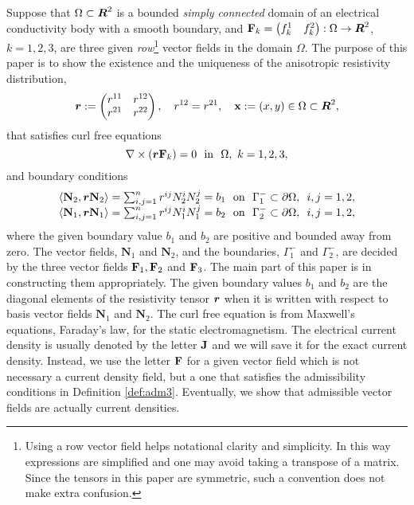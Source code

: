 \documentclass[11pt]{amsart}
\theoremstyle{plain}
\numberwithin{equation}{section}
\numberwithin{Thm}{section}
\def\R{\mbox{\boldmath$R$}}
\def\J{{\bf J}}
\def\N{{\mathbf N}}
\def\F{{\bf F}}
\def\r{{\bf r}}
\def\x{{\bf x}}
\def\r{\mbox{\boldmath$r$}}
\begin{document}
Suppose that $\Omega\subset\R^2$ is a bounded \emph{simply connected} domain of an electrical conductivity body with a smooth boundary, and $\F_k=\begin{pmatrix} f^1_k & f^2_k \end{pmatrix}:\Omega\to\R^2$, $k=1,2,3$, are three given \emph{row}\footnote{Using a row vector field helps notational clarity and simplicity. In this way expressions are simplified and one may avoid taking a transpose of a matrix. Since the tensors in this paper are symmetric, such a convention does not make extra confusion.} vector fields in the domain $\Omega$. The purpose of this paper is to show the existence and the uniqueness of the anisotropic resistivity distribution,
\begin{equation}\label{ortho}
\r:=\begin{pmatrix}r^{11}&r^{12} \\ r^{21}& r^{22}\end{pmatrix},\quad r^{12}=r^{21},\quad \x:=(x,y)\in\Omega\subset\R^2,
\end{equation}
that satisfies curl free equations
\begin{equation}\label{Faraday}
\nabla\times(\r\F_k )=0\ \ \mbox{in}\ \ \Omega,\ k=1,2,3,
\end{equation}
and boundary conditions
\begin{equation}\label{FaradayBC}
\begin{array}{l}
\left<\N_2, \r\N_2 \right> = \sum_{i,j=1}^n r^{ij}N_2^i N_2^j=b_1\ \ \mbox{on}\ \ {\Gamma^-_1}\subset\partial\Omega,\ \, i,j=1,2,\\
\left<\N_1, \r\N_1 \right> = \sum_{i,j=1}^n r^{ij}N_1^i N_1^j=b_2\ \ \mbox{on}\ \ {\Gamma^-_2}\subset\partial\Omega,\ \, i,j=1,2,\\
\end{array}
\end{equation}
where the given boundary value $b_1$ and $b_2$ are positive and bounded away from zero. The vector fields, $\N_1$ and $\N_2$, and the boundaries, $\Gamma_{1}^-$ and $\Gamma_{2}^-$, are decided by the three vector fields $\F_1,\F_2$ and $\F_3$. The main part of this paper is in constructing them appropriately. The given boundary values $b_1$ and $b_2$ are the diagonal elements of the resistivity tensor $\r$ when it is written with respect to basis vector fields $\N_1$ and $\N_2$. The curl free equation is from Maxwell's equations, Faraday's law, for the static electromagnetism. The electrical current density is usually denoted by the letter $\J$ and we will save it for the exact current density. Instead, we use the letter $\F$ for a given vector field which is not necessary a current density field, but a one that satisfies the admissibility conditions in Definition \ref{def:adm3}. Eventually, we show that admissible vector fields are actually current densities.
\end{document}
